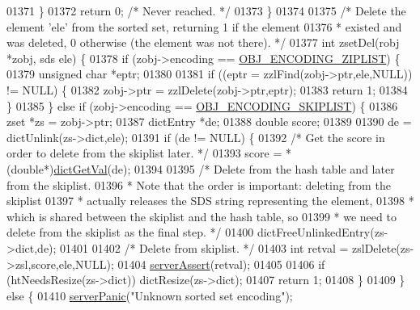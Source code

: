 \begin{DoxyCode}
01371     \}
01372     \textcolor{keywordflow}{return} 0; \textcolor{comment}{/* Never reached. */}
01373 \}
01374 
01375 \textcolor{comment}{/* Delete the element 'ele' from the sorted set, returning 1 if the element}
01376 \textcolor{comment}{ * existed and was deleted, 0 otherwise (the element was not there). */}
01377 \textcolor{keywordtype}{int} zsetDel(robj *zobj, sds ele) \{
01378     \textcolor{keywordflow}{if} (zobj->encoding == \hyperlink{server_8h_aabf064ede983103f1fd0df2086e84eee}{OBJ\_ENCODING\_ZIPLIST}) \{
01379         \textcolor{keywordtype}{unsigned} \textcolor{keywordtype}{char} *eptr;
01380 
01381         \textcolor{keywordflow}{if} ((eptr = zzlFind(zobj->ptr,ele,NULL)) != NULL) \{
01382             zobj->ptr = zzlDelete(zobj->ptr,eptr);
01383             \textcolor{keywordflow}{return} 1;
01384         \}
01385     \} \textcolor{keywordflow}{else} \textcolor{keywordflow}{if} (zobj->encoding == \hyperlink{server_8h_acfb35db5cb30ed113ed23aeb1a224c4c}{OBJ\_ENCODING\_SKIPLIST}) \{
01386         zset *zs = zobj->ptr;
01387         dictEntry *de;
01388         \textcolor{keywordtype}{double} score;
01389 
01390         de = dictUnlink(zs->dict,ele);
01391         \textcolor{keywordflow}{if} (de != NULL) \{
01392             \textcolor{comment}{/* Get the score in order to delete from the skiplist later. */}
01393             score = *(\textcolor{keywordtype}{double}*)\hyperlink{dict_8h_ae8d2cc391873b2bea2b87c4f80f43120}{dictGetVal}(de);
01394 
01395             \textcolor{comment}{/* Delete from the hash table and later from the skiplist.}
01396 \textcolor{comment}{             * Note that the order is important: deleting from the skiplist}
01397 \textcolor{comment}{             * actually releases the SDS string representing the element,}
01398 \textcolor{comment}{             * which is shared between the skiplist and the hash table, so}
01399 \textcolor{comment}{             * we need to delete from the skiplist as the final step. */}
01400             dictFreeUnlinkedEntry(zs->dict,de);
01401 
01402             \textcolor{comment}{/* Delete from skiplist. */}
01403             \textcolor{keywordtype}{int} retval = zslDelete(zs->zsl,score,ele,NULL);
01404             \hyperlink{server_8h_a88114b5169b4c382df6b56506285e56a}{serverAssert}(retval);
01405 
01406             \textcolor{keywordflow}{if} (htNeedsResize(zs->dict)) dictResize(zs->dict);
01407             \textcolor{keywordflow}{return} 1;
01408         \}
01409     \} \textcolor{keywordflow}{else} \{
01410         \hyperlink{server_8h_a11cc378e7778a830b41240578de3b204}{serverPanic}(\textcolor{stringliteral}{"Unknown sorted set encoding"});

\end{DoxyCode}

